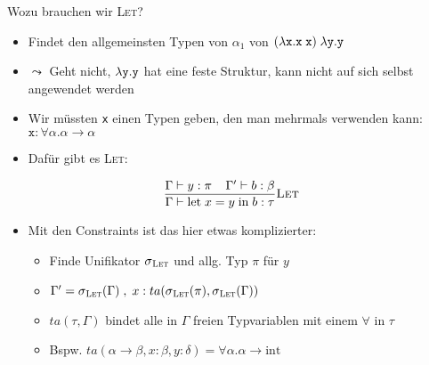 \documentclass{beamer}
\begin{document}
\newcommand{\unifierLet}{\sigma{}_{\textrm{\textsc{Let}}}}

\begin{frame}{Wozu brauchen wir \textsc{Let}?}
	\begin{itemize}
		\item Findet den allgemeinsten Typen von $\alpha_1$ von $(\abs{\texttt{x}}{\liin{\texttt{x}}{\texttt{x}}})\;\abs{\texttt{y}}{\texttt{y}}$
		\pause
		\item $\leadsto$ Geht nicht, $\abs{\texttt{y}}{\texttt{y}}$ hat eine feste Struktur, kann nicht auf sich selbst angewendet werden
		\item Wir müssten \texttt{x} einen Typen geben, den man mehrmals verwenden kann: $\texttt{x} : \forall \alpha . \alpha \to \alpha$
		\pause
		\item Dafür gibt es \textsc{Let}:
	\end{itemize}

		\begin{equation*}
		\typeRule{Let}{
			\Gamma \vdash y : \pi
			\;\;\;\;
			\Gamma' \vdash b : \beta
		}{
			\Gamma \vdash \textrm{let}\;x = y\;\textrm{in}\;b : \tau
		}
		\end{equation*}
	
	\begin{itemize}
		\item Mit den Constraints ist das hier etwas komplizierter:
		\begin{itemize}
			\item Finde Unifikator $\unifierLet$ und allg. Typ $\pi$ für $y$
			\item $\Gamma' = \unifierLet(\Gamma)\;,\;x : ta(\unifierLet(\pi), \unifierLet(\Gamma))$
			\item $ta(\tau, \Gamma)$ bindet alle in $\Gamma$ freien Typvariablen mit einem $\forall$ in $\tau$
			\item Bspw. $ta(\alpha \to \beta, x : \beta, y : \delta) = \forall \alpha . \alpha \to \textrm{int}$
		\end{itemize}
	\end{itemize}
\end{frame}
\end{document}
